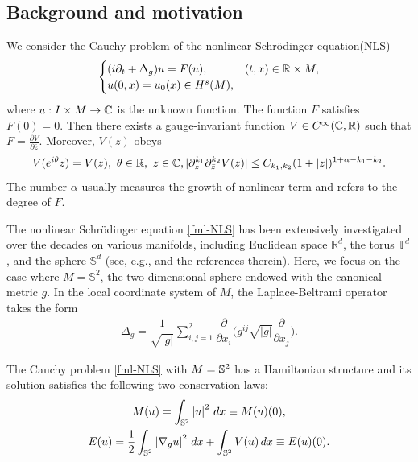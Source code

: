 \documentclass[11pt, reqno]{amsart}
\numberwithin{equation}{section}
\theoremstyle{definition}
\theoremstyle{remark}
\begin{document}
\subsection{Background and motivation}
We consider the Cauchy problem of the nonlinear Schr\"odinger equation(NLS)
\begin{equation}\label{fml-NLS}
\begin{cases}
(i\partial_{t}+\Delta_g)u=F(u) , &(t,x)\in\Bbb{R}\times M, \\
u(0,x)=u_{0}(x)\in H^s(M),
\end{cases}
\end{equation}
where $u:I\times M\to\Bbb C $ is the unknown function. The function $F$ satisfies $F(0)=0$. Then there exists a gauge-invariant function $V\in C^\infty(\Bbb C,\Bbb R)$ such that $F=\frac{\partial V}{\partial \bar{z}}$. Moreover, $V(z)$ obeys 
\begin{gather}\label{condition-2}
 V(e^{i\theta}z)=V(z),\,\,\theta\in\Bbb R,\,\,z\in\Bbb C,
  |\partial_z^{k_1}\partial_{\bar{z}}^{k_2}V(z)|\leq C_{k_1,k_2}(1+|z|)^{1+\alpha-k_1-k_2}.
\end{gather}
The number $\alpha$ usually measures the growth of nonlinear term and refers to the degree of $F$.
	
The nonlinear Schr\"odinger equation \eqref{fml-NLS} has been extensively investigated over the decades on various manifolds, including Euclidean space $\mathbb{R}^d$, the torus $\mathbb{T}^d$, and the sphere $\mathbb{S}^d$ (see, e.g., \cite{Bour,Burq1,Burq2,Caze,HTT-Duke,KM,KV1,Pausader,Tao} and the references therein). Here, we focus on the case where $M = \mathbb{S}^2$, the two-dimensional sphere endowed with the canonical metric $g$.
In the local coordinate system of $M$, the Laplace-Beltrami operator takes the form
\begin{align*}
\Delta_g=\dfrac{1}{\sqrt{|g|}}\sum\limits_{i,j=1}^2\dfrac{\partial}{\partial x_i}\Big(g^{ij}\sqrt{|g|}\dfrac\partial{\partial x_j}\Big).
\end{align*}
	
	
The Cauchy problem \eqref{fml-NLS} with $M=\Bbb S^2$ has a Hamiltonian structure and its solution satisfies the following two conservation laws:
\begin{gather}\label{mass}
M(u)=\int_{\Bbb{S}^2}\left|u\right|^2\,dx \equiv M(u)(0),  \\
E(u)=\frac12\int_{\Bbb{S}^2}\left|\nabla_g u\right|^2\,dx+{\int_{\Bbb{S}^2}V(u)\,dx} \equiv E(u)(0).\label{energy}
\end{gather}
	
\end{document}
